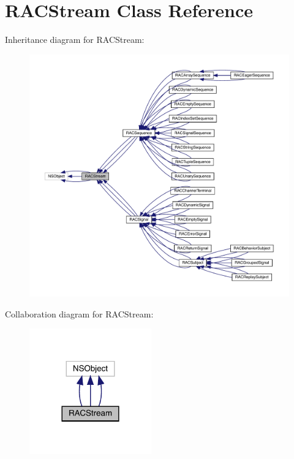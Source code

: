 \hypertarget{interface_r_a_c_stream}{}\section{R\+A\+C\+Stream Class Reference}
\label{interface_r_a_c_stream}


Inheritance diagram for R\+A\+C\+Stream\+:\nopagebreak
\begin{figure}[H]
\begin{center}
\leavevmode
\includegraphics[width=350pt]{interface_r_a_c_stream__inherit__graph}
\end{center}
\end{figure}


Collaboration diagram for R\+A\+C\+Stream\+:\nopagebreak
\begin{figure}[H]
\begin{center}
\leavevmode
\includegraphics[width=149pt]{interface_r_a_c_stream__coll__graph}
\end{center}
\end{figure}
